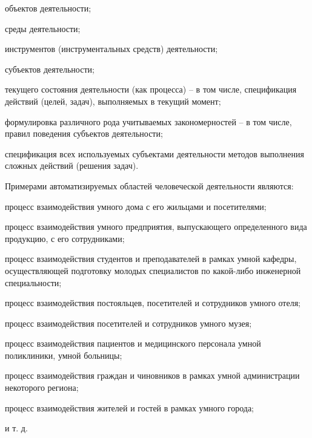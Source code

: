 \begin{scnsubstruct}
{        \begin{scnitemize}
            \item объектов деятельности;
            \item среды деятельности;
            \item инструментов (инструментальных средств) деятельности;
            \item субъектов деятельности;
            \item текущего состояния деятельности (как процесса) -- в том числе, спецификация действий (целей, задач), выполняемых в текущий момент;
            \item формулировка различного рода учитываемых закономерностей -- в том числе, правил поведения субъектов деятельности;
            \item спецификация всех используемых субъектами деятельности методов выполнения сложных действий (решения задач).
        \end{scnitemize}
        Примерами автоматизируемых областей человеческой деятельности являются:
        \begin{scnitemize}
            \item процесс взаимодействия умного дома с его жильцами и посетителями;
            \item процесс взаимодействия умного предприятия, выпускающего определенного вида продукцию, с его сотрудниками;
            \item процесс взаимодействия студентов и преподавателей в рамках умной кафедры, осуществляющей подготовку молодых специалистов по какой-либо инженерной специальности;
            \item процесс взаимодействия постояльцев, посетителей и сотрудников умного отеля;
            \item процесс взаимодействия посетителей и сотрудников умного музея;
            \item процесс взаимодействия пациентов и медицинского персонала умной поликлиники, умной больницы;
            \item процесс взаимодействия граждан и чиновников в рамках умной администрации некоторого региона;
            \item процесс взаимодействия жителей и гостей в рамках умного города;
            \item и т. д.
        \end{scnitemize}
}
\end{scnsubstruct}
